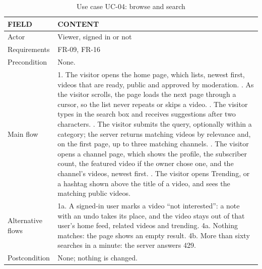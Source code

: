 \begin{table}[H]
\centering
\caption{Use case UC-04: browse and search}
\label{tab:uc-browse}
\small
\begin{tabularx}{\textwidth}{p{} X}
\toprule
\textbf{FIELD} & \textbf{CONTENT} \\
\midrule
Actor & Viewer, signed in or not \\
Requirements & FR-09, FR-16 \\
Precondition & None. \\
Main flow &
  1. The visitor opens the home page, which lists, newest first, videos that are ready, public and approved by moderation. \newline
  2. As the visitor scrolls, the page loads the next page through a cursor, so the list never repeats or skips a video. \newline
  3. The visitor types in the search box and receives suggestions after two characters. \newline
  4. The visitor submits the query, optionally within a category; the server returns matching videos by relevance and, on the first page, up to three matching channels. \newline
  5. The visitor opens a channel page, which shows the profile, the subscriber count, the featured video if the owner chose one, and the channel's videos, newest first. \newline
  6. The visitor opens Trending, or a hashtag shown above the title of a video, and sees the matching public videos. \\
Alternative flows &
  1a. A signed-in user marks a video ``not interested'': a note with an undo takes its place, and the video stays out of that user's home feed, related videos and trending. \newline
  4a. Nothing matches: the page shows an empty result. \newline
  4b. More than sixty searches in a minute: the server answers 429. \\
Postcondition & None; nothing is changed. \\
\bottomrule
\end{tabularx}
\end{table}

